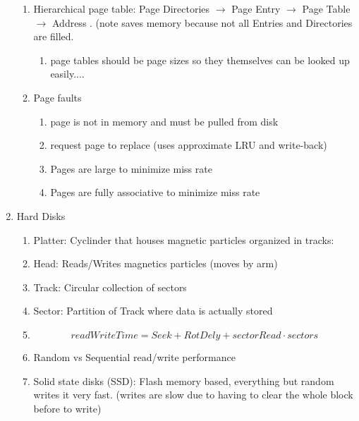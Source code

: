 \documentclass[12pt]{article}
\renewcommand{\=}[1]{\stackrel{#1}{=}} %
\theoremstyle{definition}
\theoremstyle{remark}
\begin{document}
\begin{enumerate}
\begin{enumerate}
    \item Hierarchical page table: Page Directories $\rightarrow$ Page
      Entry $\rightarrow$ Page Table $\rightarrow$ Address . (note
      saves memory because not all Entries and Directories are
      filled.
      \begin{enumerate}
      \item  page tables should be page sizes so they themselves can be
        looked up easily....
      \end{enumerate}

    \item Page faults
      \begin{enumerate}
      \item page is not in memory and must be pulled from disk
      \item request page to replace (uses approximate LRU and write-back)
      \item Pages are large to minimize miss rate
      \item Pages are fully associative to minimize miss rate
      \end{enumerate}

    \end{enumerate}

  \item Hard Disks
    \begin{enumerate}
    \item Platter: Cyclinder that houses magnetic particles organized
      in tracks:
    \item Head: Reads/Writes magnetics particles (moves by arm)
    \item Track: Circular collection of sectors
    \item Sector: Partition of Track where data is actually stored
    \item 
      \begin{equation}
        readWriteTime = Seek+RotDely +sectorRead\cdot sectors
      \end{equation}

    \item Random vs Sequential read/write performance
    \item Solid state disks (SSD): Flash memory based, everything but
      random writes it very fast. (writes are slow due to having to
      clear the whole block before to write)
    \end{enumerate}


\end{enumerate}
\end{document}
